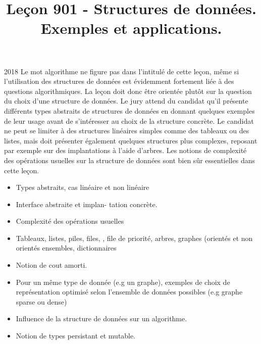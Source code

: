 \documentclass{agregfiche}
\title{Leçon 901 - Structures de données. Exemples et applications.}
\begin{document}
\maketitle

\secrapports
\begin{rapport}{2018}
	Le mot algorithme ne figure pas dans l’intitulé de cette leçon, même si l’utilisation des structures de
	données est évidemment fortement liée à des questions algorithmiques. La leçon doit donc être orientée
	plutôt sur la question du choix d’une structure de données. Le jury attend du candidat qu’il présente
	différents types abstraits de structures de données en donnant quelques exemples de leur usage avant de
	s’intéresser au choix de la structure concrète. Le candidat ne peut se limiter à des structures linéaires
	simples comme des tableaux ou des listes, mais doit présenter également quelques structures plus
	complexes, reposant par exemple sur des implantations à l’aide d’arbres. Les notions de complexité des
	opérations usuelles sur la structure de données sont bien sûr essentielles dans cette leçon.
\end{rapport}

\secindispensables

\begin{itemize}
	\item  Types abstraits, cas linéaire et non linéaire
	\item Interface abstraite et implan-
	tation concrète.
	\item Complexité des opérations usuelles
\end{itemize}

\secasavoir

\begin{itemize}
	\item  Tableaux, listes, piles, files, , file de priorité, arbres, graphes (orientés et non orientés ensembles, dictionnaires
	\item Notion de cout amorti.
	\item Pour un même type de donnée (e.g un graphe), exemples de choix de représentation optimisé selon l'ensemble de données possibles (e.g graphe sparse ou dense)
	\item Influence de la structure de données sur un algorithme.
	\item Notion de types persistant et mutable.
	
\end{itemize}

\secidees
\end{document}
